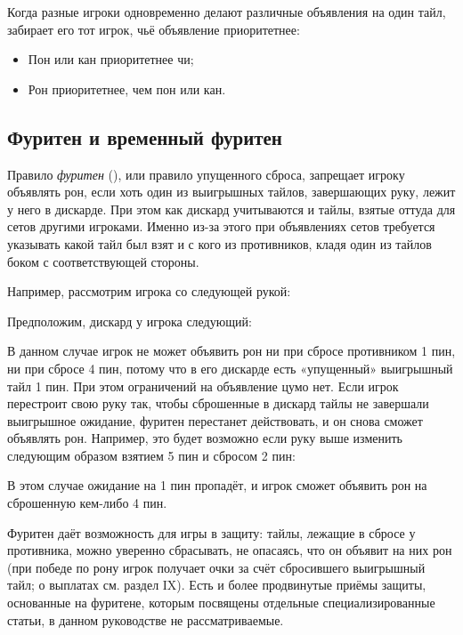 Когда разные игроки одновременно делают различные объявления на один тайл, забирает его тот игрок, чьё объявление приоритетнее:

\begin{itemize}
	\item Пон или кан приоритетнее чи;
	\item Рон приоритетнее, чем пон или кан.
\end{itemize}

\subsection{Фуритен и временный фуритен}

Правило \textit{фуритен} (), или правило упущенного сброса, запрещает игроку объявлять рон, если хоть один из выигрышных тайлов, завершающих руку, лежит у него в дискарде. При этом как дискард учитываются и тайлы, взятые оттуда для сетов другими игроками. Именно из-за этого при объявлениях сетов требуется указывать какой тайл был взят и с кого из противников, кладя один из тайлов боком с соответствующей стороны.

Например, рассмотрим игрока со следующей рукой:


Предположим, дискард у игрока следующий:


В данном случае игрок не может объявить рон ни при сбросе противником 1 пин, ни при сбросе 4 пин, потому что в его дискарде есть «упущенный» выигрышный тайл 1 пин. При этом ограничений на объявление цумо нет. Если игрок перестроит свою руку так, чтобы сброшенные в дискард тайлы не завершали выигрышное ожидание, фуритен перестанет действовать, и он снова сможет объявлять рон. Например, это будет возможно если руку выше изменить следующим образом взятием 5 пин и сбросом 2 пин: 


В этом случае ожидание на 1 пин пропадёт, и игрок сможет объявить рон на сброшенную кем-либо 4 пин. 

Фуритен даёт возможность для игры в защиту: тайлы, лежащие в сбросе у противника, можно уверенно сбрасывать, не опасаясь, что он объявит на них рон (при победе по рону игрок получает очки за счёт сбросившего выигрышный тайл; о выплатах см. раздел IX). Есть и более продвинутые приёмы защиты, основанные на фуритене, которым посвящены отдельные специализированные статьи, в данном руководстве не рассматриваемые.

